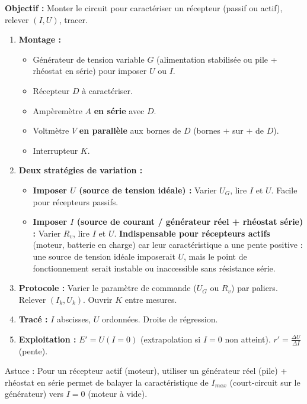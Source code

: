 \documentclass[11pt]{article}
\newcommand{\cle}[1]{{\popxbold\color{popdark}#1}}
\begin{document}
\begin{methode}[Réaliser le montage et tracer la caractéristique $U=f(I)$ d'un récepteur]
\textbf{Objectif :} Monter le circuit pour caractériser un récepteur (passif ou actif), relever $(I, U)$, tracer.
\begin{enumerate}
    \item \textbf{Montage :}
        \begin{itemize}
            \item Générateur de tension variable $G$ (alimentation stabilisée ou pile + rhéostat en série) pour imposer $U$ ou $I$.
            \item Récepteur $D$ à caractériser.
            \item Ampèremètre $A$ \textbf{en série} avec $D$.
            \item Voltmètre $V$ \textbf{en parallèle} aux bornes de $D$ (bornes $+$ sur $+$ de $D$).
            \item Interrupteur $K$.
        \end{itemize}
    \item \textbf{Deux stratégies de variation :}
        \begin{itemize}
            \item \textbf{Imposer $U$ (source de tension idéale) :} Varier $U_G$, lire $I$ et $U$. Facile pour récepteurs passifs.
            \item \textbf{Imposer $I$ (source de courant / générateur réel + rhéostat série) :} Varier $R_v$, lire $I$ et $U$. \textbf{Indispensable pour récepteurs actifs} (moteur, batterie en charge) car leur caractéristique a une pente positive : une source de tension idéale imposerait $U$, mais le point de fonctionnement serait instable ou inaccessible sans résistance série.
        \end{itemize}
    \item \textbf{Protocole :} Varier le paramètre de commande ($U_G$ ou $R_v$) par paliers. Relever $(I_k, U_k)$. Ouvrir $K$ entre mesures.
    \item \textbf{Tracé :} $I$ abscisses, $U$ ordonnées. Droite de régression.
    \item \textbf{Exploitation :} $E' = U(I=0)$ (extrapolation si $I=0$ non atteint). $r' = \frac{\Delta U}{\Delta I}$ (pente).
\end{enumerate}
\cle{Astuce} : Pour un récepteur actif (moteur), utiliser un générateur réel (pile) + rhéostat en série permet de balayer la caractéristique de $I_{max}$ (court-circuit sur le générateur) vers $I=0$ (moteur à vide).
\end{methode}
\end{document}
